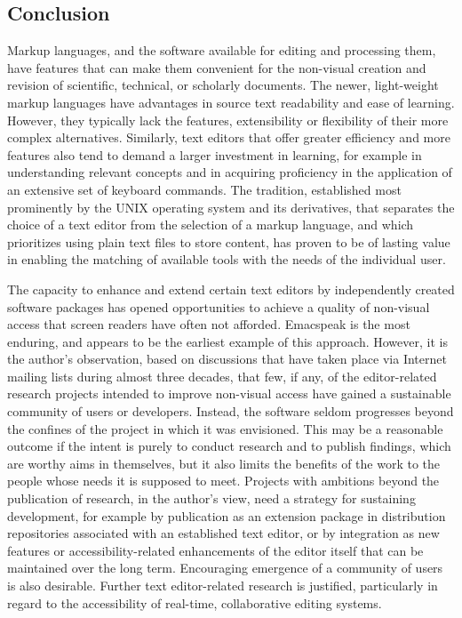 \documentclass[11pt]{sig-alternate}
\begin{document}
\begin{large}
\section*{Conclusion}
Markup languages, and the software available for editing and processing them, have features that can make them convenient for the non-visual creation and revision of scientific, technical, or scholarly documents. The newer, light-weight markup languages have advantages in source text readability and ease of learning. However, they typically lack the features, extensibility or flexibility of their more complex alternatives. Similarly, text editors that offer greater efficiency and more features also tend to demand a larger investment in learning, for example in understanding relevant concepts and in acquiring proficiency in the application of an extensive set of keyboard commands. The tradition, established most prominently by the UNIX operating system and its derivatives, that separates the choice of a text editor from the selection of a markup language, and which prioritizes using plain text files to store content, has proven to be of lasting value in enabling the matching of available tools with the needs of the individual user.

The capacity to enhance and extend certain text editors by independently created software packages has opened opportunities to achieve a quality of non-visual access that screen readers have often not afforded. Emacspeak is the most enduring, and appears to be the earliest example of this approach. However, it is the author’s observation, based on discussions that have taken place via Internet mailing lists during almost three decades, that few, if any, of the editor-related research projects intended to improve non-visual access have gained a sustainable community of users or developers. Instead, the software seldom progresses beyond the confines of the project in which it was envisioned. This may be a reasonable outcome if the intent is purely to conduct research and to publish findings, which are worthy aims in themselves, but it also limits the benefits of the work to the people whose needs it is supposed to meet. Projects with ambitions beyond the publication of research, in the author’s view, need a strategy for sustaining development, for example by publication as an extension package in distribution repositories associated with an established text editor, or by integration as new features or accessibility-related enhancements of the editor itself that can be maintained over the long term. Encouraging emergence of a community of users is also desirable. Further text editor-related research is justified, particularly in regard to the accessibility of real-time, collaborative editing systems.


\end{large}
\end{document}
